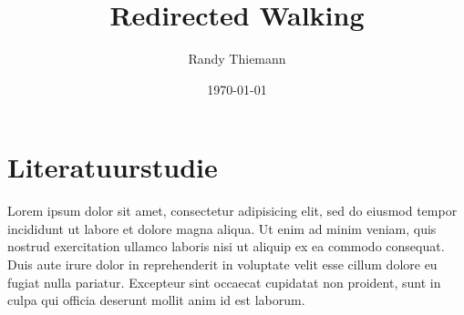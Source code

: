 \documentclass[a4paper,12pt]{article}
\begin{document}
\author{Randy Thiemann} 
\title{Redirected Walking} 
\date{\today} 
\maketitle

\section{Literatuurstudie}
Lorem ipsum dolor sit amet, consectetur adipisicing elit, sed do eiusmod
tempor incididunt ut labore et dolore magna aliqua. Ut enim ad minim veniam,
quis nostrud exercitation ullamco laboris nisi ut aliquip ex ea commodo
consequat. Duis aute irure dolor in reprehenderit in voluptate velit esse
cillum dolore eu fugiat nulla pariatur. Excepteur sint occaecat cupidatat non
proident, sunt in culpa qui officia deserunt mollit anim id est laborum.

\newpage


  
\end{document}
